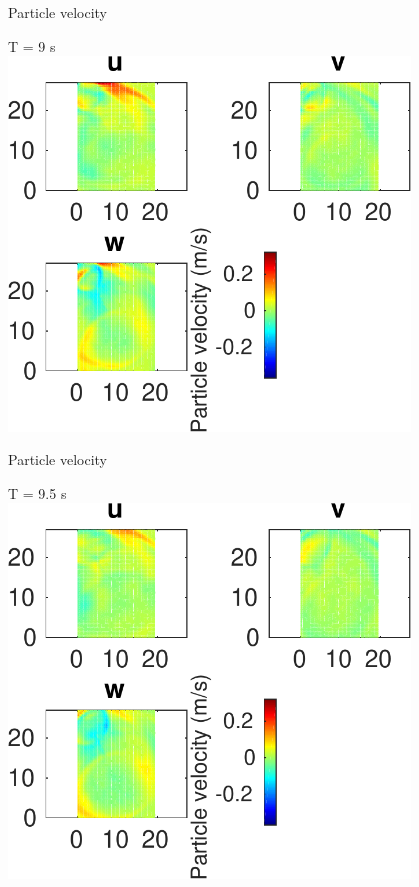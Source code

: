 \documentclass{beamer}
\begin{document}
\begin{frame}
 {Particle velocity}
 
 \centering \Large T = 9 s\\
 \includegraphics[width=0.8\textwidth]{images/horizontal_velo_00096}
 
\end{frame}

\begin{frame}
 {Particle velocity}
 
 \centering \Large T = 9.5 s\\
 \includegraphics[width=0.8\textwidth]{images/horizontal_velo_00101}
 
\end{frame}
\end{document}
